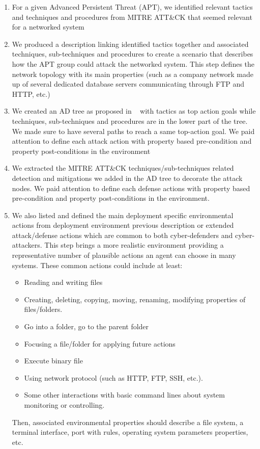 \documentclass[conference]{IEEEtran}
\begin{document}
\begin{enumerate}

    \item For a given Advanced Persistent Threat (APT), we identified relevant tactics and techniques and procedures from MITRE ATT\&CK that seemed relevant for a networked system

    \item We produced a description linking identified tactics together and associated techniques, sub-techniques and procedures to create a scenario that describes how the APT group could attack the networked system. This step defines the network topology with its main properties (such as a company network made up of several dedicated database servers communicating through FTP and HTTP, etc.)

    \item We created an AD tree as proposed in ~\cite{BKordy2010} with tactics as top action goals while techniques, sub-techniques and procedures are in the lower part of the tree. We made sure to have several paths to reach a same top-action goal. We paid attention to define each attack action with property based pre-condition and property post-conditions in the environment

    \item We extracted the MITRE ATT\&CK techniques/sub-techniques related detection and mitigations we added in the AD tree to decorate the attack nodes. We paid attention to define each defense actions with property based pre-condition and property post-conditions in the environment.

    \item We also listed and defined the main deployment specific environmental actions from deployment environment previous description or extended attack/defense actions which are common to both cyber-defenders and cyber-attackers. This step brings a more realistic environment providing a representative number of plausible actions an agent can choose in many systems.
          These common actions could include at least:
          \begin{itemize}
              \item Reading and writing files
              \item Creating, deleting, copying, moving, renaming, modifying properties of files/folders.
              \item Go into a folder, go to the parent folder
              \item Focusing a file/folder for applying future actions
              \item Execute binary file
              \item Using network protocol (such as HTTP, FTP, SSH, etc.).
              \item Some other interactions with basic command lines about system monitoring or controlling.
          \end{itemize}
          Then, associated environmental properties should describe a file system, a terminal interface, port with rules, operating system parameters properties, etc.

\end{enumerate}
\end{document}
